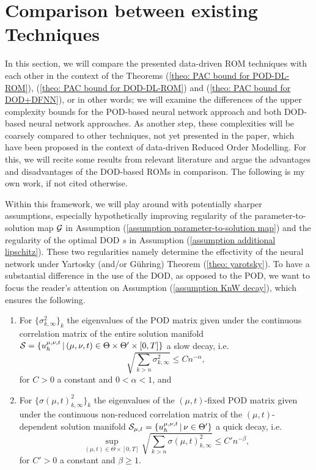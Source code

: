 \section{Comparison between existing Techniques}




In this section, we will compare the presented data-driven ROM techniques with each other
in the context of the Theorems (\ref{theo: PAC bound for POD-DL-ROM}),
(\ref{theo: PAC bound for DOD-DL-ROM}) and (\ref{theo: PAC bound for DOD+DFNN}), or in other
words; we will examine the differences of the upper complexity bounds for the POD-based 
neural network approach and both DOD-based neural network approaches.
As another step, these complexities will be coarsely compared to other techniques,
not yet presented in the paper, which have been proposed in the context of data-driven
Reduced Order Modelling. For this, we will recite some results from relevant literature
and argue the advantages and disadvantages of the DOD-based ROMs in comparison.
The following is my own work, if not cited otherwise.

Within this framework, we will play around with potentially sharper assumptions, especially
hypothetically improving regularity of the parameter-to-solution map $\mathcal{G}$ in Assumption 
(\ref{assumption parameter-to-solution map}) and the regularity of the optimal DOD $s$ in
Assumption (\ref{assumption additional lipschitz}). These two regularities namely determine 
the effectivity of the neural network under Yartosky (and/or Gühring) Theorem (\ref{theo: yarotsky}).
To have a substantial difference in the use of the DOD, as opposed to the POD, we want to focus
the reader's attention on Assumption (\ref{assumption KnW decay}), which ensures the following.
\begin{enumerate}
    \item For $\{\sigma_{k, \infty}^2\}_k$ 
    the eigenvalues of the POD matrix given
    under the continuous correlation matrix of the entire solution manifold $\mathcal{S} = \{ u_h^{\mu, \nu, t} \, \vert \, 
    (\mu, \nu, t) \in \Theta \times \Theta' \times [0, T]\}$ a slow decay, i.e.
    \begin{equation*}
         \sqrt{\sum_{k > n} \sigma_{k, \infty}^2} \leq C n^{-\alpha},
    \end{equation*}
    for $C > 0$ a constant and $0 < \alpha < 1$, and
    \item For $\{\sigma(\mu, t)_{k, \infty}^2\}_k$
    the eigenvalues of the $(\mu, t)$-fixed POD matrix given
    under the continuous non-reduced correlation matrix of the $(\mu, t)$-dependent solution manifold
    $\mathcal{S}_{\mu, t} = \{ u_h^{\mu, \nu, t} \, \vert \, \nu \in \Theta' \}$ a quick decay, i.e.
    \begin{equation*}
        \sup_{(\mu, t) \in \Theta \times [0, T]} \sqrt{\sum_{k > n} \sigma(\mu, t)_{k, \infty}^2}
        \leq C' n^{-\beta},
    \end{equation*}
    for $C' > 0$ a constant and $\beta \geq 1$.
\end{enumerate}

